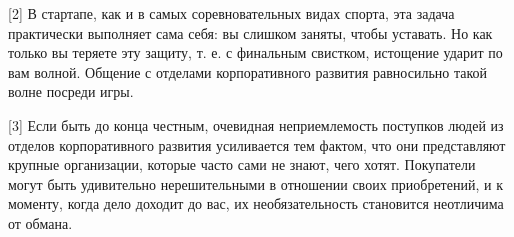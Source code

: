 \documentclass[ebook,12pt,oneside,openany]{memoir}
\begin{document}
[2] В стартапе, как и в самых соревновательных видах спорта, эта
задача практически выполняет сама себя: вы слишком заняты, чтобы
уставать. Но как только вы теряете эту защиту, т. е. с финальным
свистком, истощение ударит по вам волной. Общение с отделами
корпоративного развития равносильно такой волне посреди игры.

[3] Если быть до конца честным, очевидная неприемлемость поступков
людей из отделов корпоративного развития усиливается тем фактом, что
они представляют крупные организации, которые часто сами не знают,
чего хотят. Покупатели могут быть удивительно нерешительными в
отношении своих приобретений, и к моменту, когда дело доходит до вас,
их необязательность становится неотличима от обмана.
\end{document}
